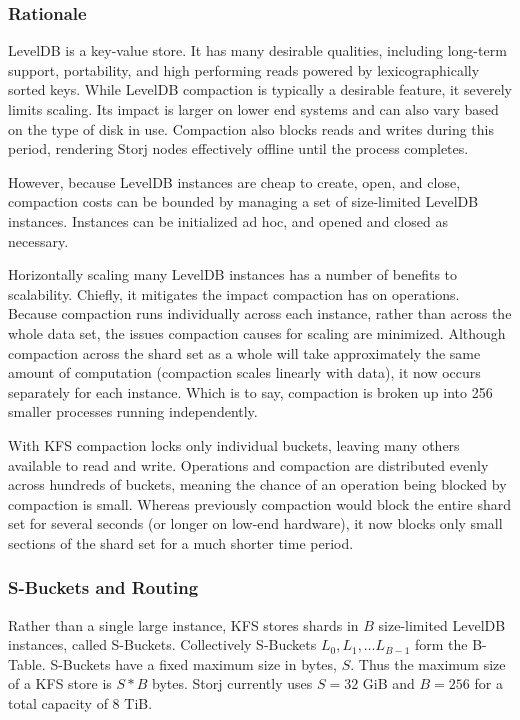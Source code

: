 \documentclass[a4paper,10pt]{article}
\begin{document}
\subsubsection{Rationale}
LevelDB is a key-value store. It has many desirable qualities, including long-term support, portability, and high performing reads powered by lexicographically sorted keys. While LevelDB compaction is typically a desirable feature, it severely limits scaling. Its impact is larger on lower end systems and can also vary based on the type of disk in use. Compaction also blocks reads and writes during this period, rendering Storj nodes effectively offline until the process completes.

However, because LevelDB instances are cheap to create, open, and close, compaction costs can be bounded by managing a set of size-limited LevelDB instances. Instances can be initialized ad hoc, and opened and closed as necessary.

Horizontally scaling many LevelDB instances has a number of benefits to scalability. Chiefly, it mitigates the impact compaction has on operations. Because compaction runs individually across each instance, rather than across the whole data set, the issues compaction causes for scaling are minimized. Although compaction across the shard set as a whole will take approximately the same amount of computation (compaction scales linearly with data), it now occurs separately for each instance. Which is to say, compaction is broken up into 256 smaller processes running independently.

With KFS compaction locks only individual buckets, leaving many others available to read and write. Operations and compaction are distributed evenly across hundreds of buckets, meaning the chance of an operation being blocked by compaction is small. Whereas previously compaction would block the entire shard set for several seconds (or longer on low-end hardware), it now blocks only small sections of the shard set for a much shorter time period.

\subsubsection{S-Buckets and Routing}
Rather than a single large instance, KFS stores shards in $ B $ size-limited LevelDB instances, called S-Buckets. Collectively S-Buckets $ L_{0} , L_{1} , … L_{B-1} $ form the B-Table. S-Buckets have a fixed maximum size in bytes, $ S $. Thus the maximum size of a KFS store is $ S * B $ bytes. Storj currently uses $ S = 32 $ GiB and $ B = 256 $ for a total capacity of 8 TiB.
\end{document}
